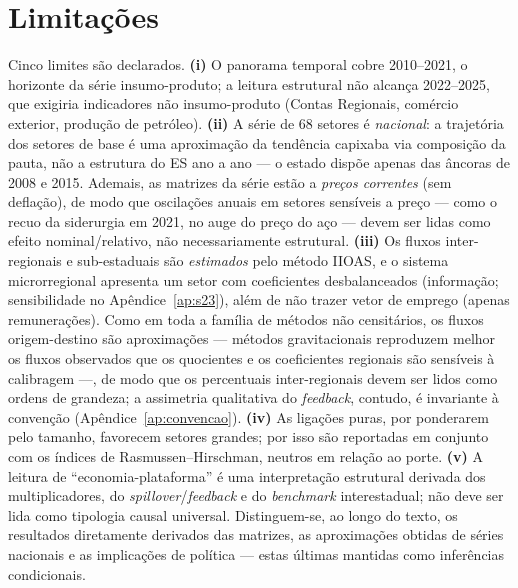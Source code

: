 \documentclass[11pt,a4paper]{article}
\begin{document}
\section{Limitações}
\label{sec:limites}
Cinco limites são declarados. \textbf{(i)} O panorama temporal cobre 2010--2021, o
horizonte da série insumo-produto; a leitura estrutural não alcança 2022--2025, que
exigiria indicadores não insumo-produto (Contas Regionais, comércio exterior, produção
de petróleo). \textbf{(ii)} A série de 68 setores é \emph{nacional}: a trajetória dos
setores de base é uma aproximação da tendência capixaba via composição da pauta, não a
estrutura do ES ano a ano --- o estado dispõe apenas das âncoras de 2008 e 2015. Ademais,
as matrizes da série estão a \emph{preços correntes} (sem deflação), de modo que oscilações
anuais em setores sensíveis a preço --- como o recuo da siderurgia em 2021, no auge do preço
do aço --- devem ser lidas como efeito nominal/relativo, não necessariamente estrutural.
\textbf{(iii)} Os fluxos inter-regionais e sub-estaduais são \emph{estimados} pelo
método IIOAS, e o sistema microrregional apresenta um setor com coeficientes
desbalanceados (informação; sensibilidade no Apêndice~\ref{ap:s23}), além de não trazer
vetor de emprego (apenas remunerações). Como em toda a família de métodos não censitários, os
fluxos origem-destino são aproximações --- métodos gravitacionais reproduzem melhor os fluxos
observados que os quocientes \citep{riddington2006comparison} e os coeficientes regionais
são sensíveis à calibragem \citep{flegg2016evaluating} ---, de modo que os percentuais
inter-regionais devem ser lidos como ordens de grandeza; a assimetria qualitativa do
\emph{feedback}, contudo, é invariante à convenção (Apêndice~\ref{ap:convencao}).
\textbf{(iv)} As ligações puras, por ponderarem pelo tamanho, favorecem setores
grandes; por isso são reportadas em conjunto com os índices de Rasmussen--Hirschman,
neutros em relação ao porte. \textbf{(v)} A leitura de ``economia-plataforma'' é uma
interpretação estrutural derivada dos multiplicadores, do \emph{spillover}/\emph{feedback} e do
\emph{benchmark} interestadual; não deve ser lida como tipologia causal universal.
Distinguem-se, ao longo do texto, os resultados diretamente derivados das matrizes, as
aproximações obtidas de séries nacionais e as implicações de política --- estas últimas
mantidas como inferências condicionais.
\end{document}
